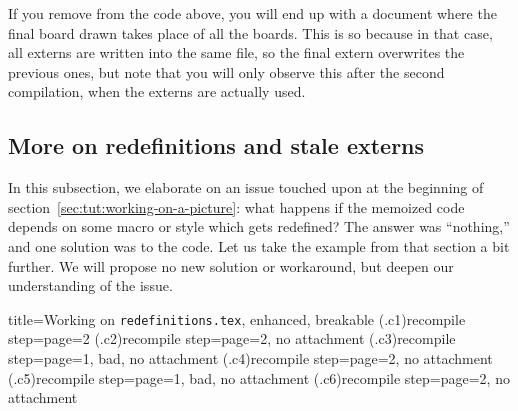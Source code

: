 \documentclass[a4paper,11pt]{article}
\begin{document}

If you remove  from the code above, you
will end up with a document where the final board drawn takes place of all the
boards.  This is so because in that case, all externs are written into the same
file, so the final extern overwrites the previous ones, but note that you will
only observe this after the second compilation, when the externs are actually
used.



\subsection{More on redefinitions and stale externs}
\label{sec:tut:redefinitions}

In this subsection, we elaborate on an issue touched upon at the beginning of
section~\ref{sec:tut:working-on-a-picture}: what happens if the memoized code
depends on some macro or style which gets redefined?  The answer was
``nothing,'' and one solution was to  the code.  Let us take
the example from that section a bit further.  We will propose no new solution
or workaround, but deepen our understanding of the issue.

\begin{tcboxedraster}[raster columns=1]{%
    title=Working on \texttt{redefinitions.tex}, enhanced, breakable}
  \setcounter{enumi}{0}%
  (.c1){recompile step={page=2}}
  (.c2){recompile step={page=2}, no attachment}
  (.c3){recompile step={page=1}, bad, no attachment}
  (.c4){recompile step={page=2}, no attachment}
  (.c5){recompile step={page=1}, bad, no attachment}
  (.c6){recompile step={page=2}, no attachment}
\end{tcboxedraster}
\end{document}
